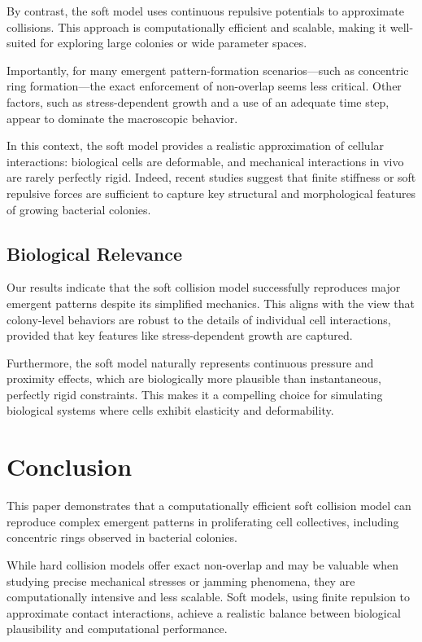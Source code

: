 \documentclass[conference]{IEEEtran}
\begin{document}
By contrast, the soft model uses continuous repulsive potentials to approximate collisions. This approach is computationally efficient and scalable, making it well-suited for exploring large colonies or wide parameter spaces.

Importantly, for many emergent pattern-formation scenarios—such as concentric ring formation—the exact enforcement of non-overlap seems less critical. Other factors, such as stress-dependent growth and a use of an adequate time step, appear to dominate the macroscopic behavior.

In this context, the soft model provides a realistic approximation of cellular interactions: biological cells are deformable, and mechanical interactions in vivo are rarely perfectly rigid. Indeed, recent studies \cite{Khan_2024, Ghosh2015, SantosDiaz2025} suggest that finite stiffness or soft repulsive forces are sufficient to capture key structural and morphological features of growing bacterial colonies.

\subsection{Biological Relevance}

Our results indicate that the soft collision model successfully reproduces major emergent patterns despite its simplified mechanics. This aligns with the view that colony-level behaviors are robust to the details of individual cell interactions, provided that key features like stress-dependent growth are captured.

Furthermore, the soft model naturally represents continuous pressure and proximity effects, which are biologically more plausible than instantaneous, perfectly rigid constraints. This makes it a compelling choice for simulating biological systems where cells exhibit elasticity and deformability.

\section{Conclusion}

This paper demonstrates that a computationally efficient soft collision model can reproduce complex emergent patterns in proliferating cell collectives, including concentric rings observed in bacterial colonies.

While hard collision models offer exact non-overlap and may be valuable when studying precise mechanical stresses or jamming phenomena, they are computationally intensive and less scalable. Soft models, using finite repulsion to approximate contact interactions, achieve a realistic balance between biological plausibility and computational performance.
\end{document}
